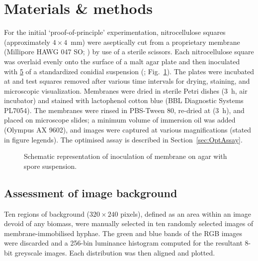 \section{Materials \& methods}

For the initial \lq proof-of-principle' experimentation, nitrocellulose squares (approximately $4 \times 4$~mm) were aseptically cut from a proprietary membrane (Millipore HAWG 047 SO; ) by use of a sterile scissors. Each nitrocellulose square was overlaid evenly onto the surface of a malt agar plate and then inoculated with \ul{5} of a standardized conidial suspension (; Fig.~\ref{fig:NCDiag}). The plates were incubated at  and test squares removed after various time intervals for drying, staining, and microscopic visualization. Membranes were dried in sterile Petri dishes (3~h,  air incubator) and stained with lactophenol cotton blue (BBL Diagnostic Systems PL7054). The membranes were rinsed in PBS-Tween 80, re-dried at  (3~h), and placed on microscope slides; a minimum volume of immersion oil was added (Olympus AX 9602), and images were captured at various magnifications (stated in figure legends). The optimised assay is described in Section~\ref{sec:OptAssay}.

\begin{figure}[tb]
	\centering
	\caption{Schematic representation of inoculation of membrane on agar with spore suspension.}
	\label{fig:NCDiag}
\end{figure}

\subsection{Assessment of image background}

Ten regions of background ($320 \times 240$ pixels), defined as an area within an image devoid of any biomass, were manually selected in ten randomly selected images of membrane-immobilised hyphae. The green and blue bands of the RGB images were discarded and a 256-bin luminance histogram computed for the resultant 8-bit greyscale images. Each distribution was then aligned and plotted.